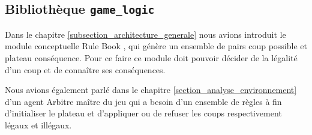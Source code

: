 \subsection{Bibliothèque \texttt{\gls{game_logic}}}
Dans le chapitre \ref{subsection_architecture_generale} nous avions introduit le module conceptuelle \og Rule Book \fg{}, qui génère un ensemble de pairs coup possible et plateau conséquence. Pour ce faire ce module doit pouvoir décider de la légalité d'un coup et de connaître ses conséquences. 

Nous avions également parlé dans le chapitre \ref{section_analyse_environnement} d'un agent \og Arbitre \fg{} maître du jeu qui a besoin d'un ensemble de règles à fin d'initialiser le plateau et d'appliquer ou de refuser les coups respectivement légaux et illégaux.


